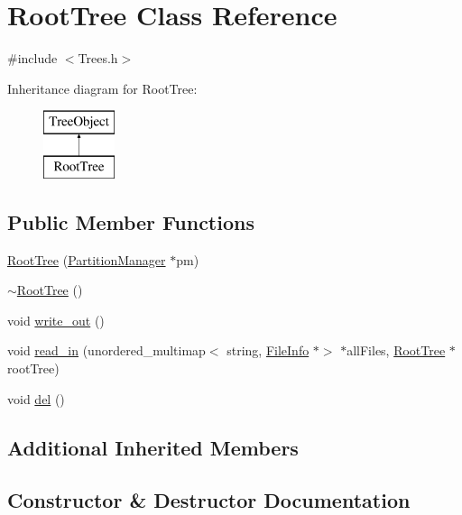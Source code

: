 \hypertarget{class_root_tree}{}\section{Root\+Tree Class Reference}
\label{class_root_tree}


{\ttfamily \#include $<$Trees.\+h$>$}

Inheritance diagram for Root\+Tree\+:\begin{figure}[H]
\begin{center}
\leavevmode
\includegraphics[height=2.000000cm]{class_root_tree}
\end{center}
\end{figure}
\subsection*{Public Member Functions}
\begin{DoxyCompactItemize}
\item 
\mbox{\hyperlink{class_root_tree_a491c0374c9024faf1e1c8045f21a4cad}{Root\+Tree}} (\mbox{\hyperlink{class_partition_manager}{Partition\+Manager}} $\ast$pm)
\item 
\mbox{\hyperlink{class_root_tree_a0e117b4a1eb94d395f9763b3cbc24916}{$\sim$\+Root\+Tree}} ()
\item 
void \mbox{\hyperlink{class_root_tree_ad6eefe5d46ee37b3725799897a78c2dd}{write\+\_\+out}} ()
\item 
void \mbox{\hyperlink{class_root_tree_a658eed78be67e890de2283af960dc532}{read\+\_\+in}} (unordered\+\_\+multimap$<$ string, \mbox{\hyperlink{class_file_info}{File\+Info}} $\ast$$>$ $\ast$all\+Files, \mbox{\hyperlink{class_root_tree}{Root\+Tree}} $\ast$root\+Tree)
\item 
void \mbox{\hyperlink{class_root_tree_ac431dc04b767fc66791c251d8173650d}{del}} ()
\end{DoxyCompactItemize}
\subsection*{Additional Inherited Members}


\subsection{Constructor \& Destructor Documentation}
\mbox{\label{class_root_tree_a491c0374c9024faf1e1c8045f21a4cad}} 
